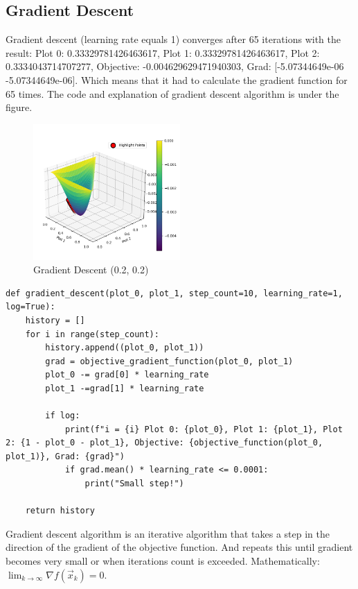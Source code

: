 \documentclass{article}
\begin{document}
        \subsection*{Gradient Descent}
            Gradient descent (learning rate equals 1) converges after 65 iterations with the result: Plot 0: 0.33329781426463617, Plot 1: 0.33329781426463617, Plot 2: 0.3334043714707277, Objective: -0.004629629471940303, Grad: [-5.07344649e-06 -5.07344649e-06]. Which means that it had to calculate the gradient function for 65 times. The code and explanation of gradient descent algorithm is under the figure.
        \begin{figure}[H]
            \centering
            \includegraphics[width=0.5\textwidth]{gradient-02.png}
            \caption{Gradient Descent (0.2, 0.2)}
        \end{figure}
        \begin{verbatim}
def gradient_descent(plot_0, plot_1, step_count=10, learning_rate=1, log=True):
    history = []
    for i in range(step_count):
        history.append((plot_0, plot_1))
        grad = objective_gradient_function(plot_0, plot_1)
        plot_0 -= grad[0] * learning_rate
        plot_1 -=grad[1] * learning_rate

        if log:
            print(f"i = {i} Plot 0: {plot_0}, Plot 1: {plot_1}, Plot 2: {1 - plot_0 - plot_1}, Objective: {objective_function(plot_0, plot_1)}, Grad: {grad}")
            if grad.mean() * learning_rate <= 0.0001:
                print("Small step!")
    
    return history
        \end{verbatim}
        Gradient descent algorithm is an iterative algorithm that takes a step in the direction of the gradient of the objective function. And repeats this until gradient becomes very small or when iterations count is exceeded. Mathematically: $\lim_{k \to \infty} \nabla f(\vec{x}_k) = 0$.
\end{document}
